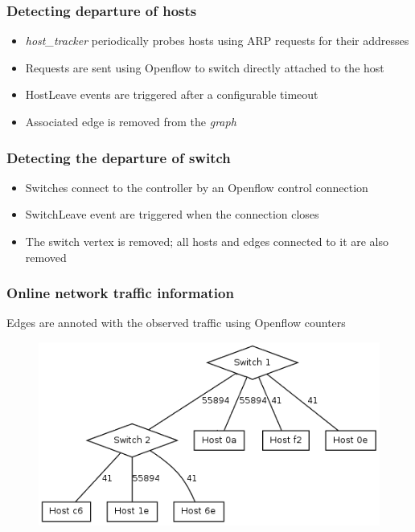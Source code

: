 %
%
\begin{frame}\frametitle{Detecting departure of hosts}

    \begin{itemize}
        \item \emph{host\_tracker} periodically probes hosts using ARP requests
            for their addresses
        \item Requests are sent using Openflow to switch directly attached to
            the host
        \item HostLeave events are triggered after a configurable timeout 
        \item Associated edge is removed from the \emph{graph}
    \end{itemize}

\end{frame}



%
%
\begin{frame}\frametitle{Detecting the departure of switch}

    \begin{itemize}
        \item Switches connect to the controller by an Openflow control
            connection
        \item SwitchLeave event are triggered when the connection closes
        \item The switch vertex is removed; all hosts and edges 
              connected to it are also removed
    \end{itemize}

\end{frame}



%
%
\begin{frame}\frametitle{Online network traffic information}

    Edges are annoted with the observed traffic using Openflow counters
	\begin{figure}[h]
        \centering
        \includegraphics[scale=0.6]{img/iperf}
    \end{figure}

\end{frame}


